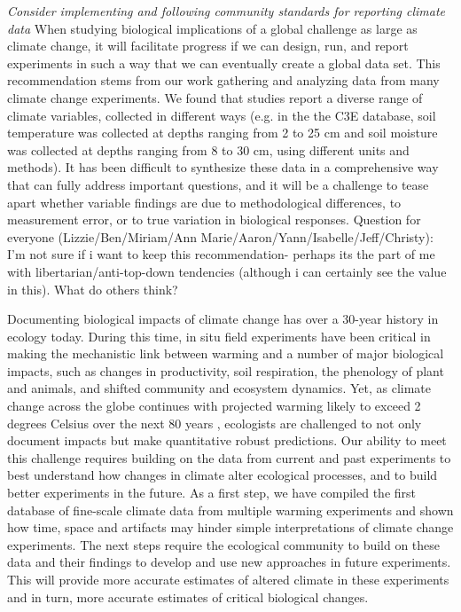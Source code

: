 \documentclass{article}
\begin{document}
\par\textit{Consider implementing and following community standards for reporting climate data} 
When studying biological implications of a global challenge as large as climate change, it will facilitate progress if we can design, run, and report experiments in such a way that we can eventually create a global data set. This recommendation stems from our work gathering and analyzing data from many climate change experiments. We found that studies report a diverse range of climate variables, collected in different ways (e.g. in the the C3E database, soil temperature was collected at depths ranging from 2 to 25 cm and soil moisture was collected at depths ranging from 8 to 30 cm, using different units and methods). It has been difficult to synthesize these data in a comprehensive way that can fully address important questions, and it will be a challenge to tease apart whether variable findings are due to methodological differences, to measurement error, or to true variation in biological responses. Question for everyone (Lizzie/Ben/Miriam/Ann Marie/Aaron/Yann/Isabelle/Jeff/Christy): I'm not sure if i want to keep this recommendation- perhaps its the part of me with libertarian/anti-top-down tendencies (although i can certainly see the value in this). What do others think? %
\par Documenting biological impacts of climate change has over a 30-year history in ecology today. During this time, in situ field experiments have been critical in making the mechanistic link between warming and a number of major biological impacts, such as changes in productivity, soil respiration, the phenology of plant and animals, and shifted community and ecosystem dynamics. Yet, as climate change across the globe continues with projected warming likely to exceed 2 degrees Celsius over the next 80 years \citep{ipcc2013}, ecologists are challenged to not only document impacts but make quantitative robust predictions. Our ability to meet this challenge requires building on the data from current and past experiments to best understand how changes in climate alter ecological processes, and to build better experiments in the future. As a first step, we have compiled the first database of fine-scale climate data from multiple warming experiments and shown how time, space and artifacts may hinder simple interpretations of climate change experiments. The next steps require the ecological community to build on these data and their findings to develop and use new approaches in future experiments. This will provide more accurate estimates of altered climate in these experiments and in turn, more accurate estimates of critical biological changes. 

\clearpage
\clearpage
\end{document}
